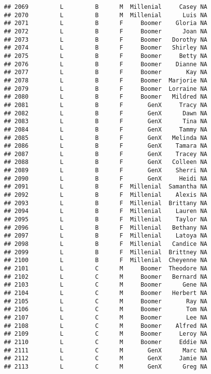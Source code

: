 \documentclass[
]{article}
\begin{document}
\begin{verbatim}
## 2069         L         B      M  Millenial     Casey NA
## 2070         L         B      M  Millenial      Luis NA
## 2071         L         B      F     Boomer    Gloria NA
## 2072         L         B      F     Boomer      Joan NA
## 2073         L         B      F     Boomer   Dorothy NA
## 2074         L         B      F     Boomer   Shirley NA
## 2075         L         B      F     Boomer     Betty NA
## 2076         L         B      F     Boomer    Dianne NA
## 2077         L         B      F     Boomer       Kay NA
## 2078         L         B      F     Boomer  Marjorie NA
## 2079         L         B      F     Boomer  Lorraine NA
## 2080         L         B      F     Boomer   Mildred NA
## 2081         L         B      F       GenX     Tracy NA
## 2082         L         B      F       GenX      Dawn NA
## 2083         L         B      F       GenX      Tina NA
## 2084         L         B      F       GenX     Tammy NA
## 2085         L         B      F       GenX   Melinda NA
## 2086         L         B      F       GenX    Tamara NA
## 2087         L         B      F       GenX    Tracey NA
## 2088         L         B      F       GenX   Colleen NA
## 2089         L         B      F       GenX    Sherri NA
## 2090         L         B      F       GenX     Heidi NA
## 2091         L         B      F  Millenial  Samantha NA
## 2092         L         B      F  Millenial    Alexis NA
## 2093         L         B      F  Millenial  Brittany NA
## 2094         L         B      F  Millenial    Lauren NA
## 2095         L         B      F  Millenial    Taylor NA
## 2096         L         B      F  Millenial   Bethany NA
## 2097         L         B      F  Millenial    Latoya NA
## 2098         L         B      F  Millenial   Candice NA
## 2099         L         B      F  Millenial  Brittney NA
## 2100         L         B      F  Millenial  Cheyenne NA
## 2101         L         C      M     Boomer  Theodore NA
## 2102         L         C      M     Boomer   Bernard NA
## 2103         L         C      M     Boomer      Gene NA
## 2104         L         C      M     Boomer   Herbert NA
## 2105         L         C      M     Boomer       Ray NA
## 2106         L         C      M     Boomer       Tom NA
## 2107         L         C      M     Boomer       Lee NA
## 2108         L         C      M     Boomer    Alfred NA
## 2109         L         C      M     Boomer     Leroy NA
## 2110         L         C      M     Boomer     Eddie NA
## 2111         L         C      M       GenX      Marc NA
## 2112         L         C      M       GenX     Jamie NA
## 2113         L         C      M       GenX      Greg NA

\end{verbatim}
\end{document}
